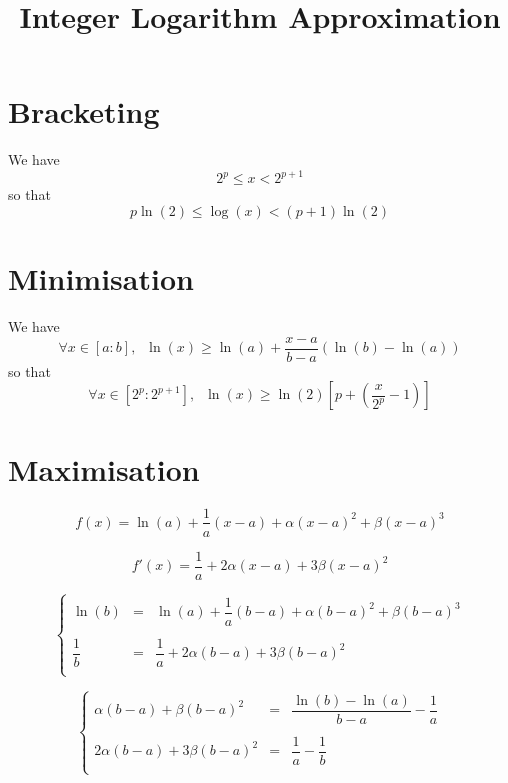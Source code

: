 \documentclass[aps]{revtex4}
\begin{document}
\title{Integer Logarithm Approximation}

\section{Bracketing}

We have 
\begin{equation}
	2^p \leq x < 2^{p+1}
\end{equation}
so that
\begin{equation}
	p\ln(2) \leq \log(x) < (p+1) \ln(2)
\end{equation}

\section{Minimisation}
We have
\begin{equation}
\forall x \in [a:b], \;\; \ln(x) \geq \ln(a) + \dfrac{x-a}{b-a} \left( \ln(b) - \ln(a) \right)
\end{equation}
so that
\begin{equation}
\forall x \in [2^p:2^{p+1}],  \;\; \ln(x) \geq \ln(2) \left[ p + \left( \dfrac{x}{2^p}-1 \right) \right]
\end{equation}

\section{Maximisation}

\begin{equation}
	f(x) = \ln(a) + \dfrac{1}{a}  (x-a) + \alpha (x-a)^2 + \beta (x-a)^3
\end{equation}

\begin{equation}
	 f'(x) = \dfrac{1}{a} + 2 \alpha (x-a) + 3 \beta (x-a)^2
\end{equation}

\begin{equation}
\left\lbrace
	\begin{array}{rcl}
	\ln(b) & = & \ln(a) + \dfrac{1}{a} (b-a) + \alpha (b-a)^2 + \beta (b-a)^3\\
	\\
	\dfrac{1}{b} & = & \dfrac{1}{a} + 2\alpha(b-a) + 3\beta(b-a)^2\\
	\end{array}
\right.
\end{equation}

\begin{equation}
\left\lbrace
	\begin{array}{rcl}
	\alpha (b-a) + \beta (b-a)^2 & = & \dfrac{\ln(b) - \ln(a)}{b-a} - \dfrac{1}{a}\\
	\\
	2\alpha(b-a)  + 3\beta(b-a)^2  & = & \dfrac{1}{a}-\dfrac{1}{b}  \\
	\end{array}
\right.
\end{equation}
\end{document}
